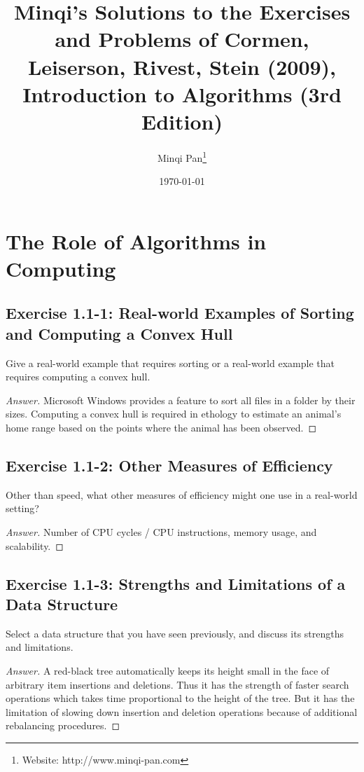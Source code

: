 \documentclass{amsbook}
\theoremstyle{definition}
\theoremstyle{remark}
\numberwithin{section}{chapter}
\numberwithin{equation}{chapter}
\begin{document}
\frontmatter
\title{Minqi's Solutions to the Exercises and Problems of Cormen, Leiserson, Rivest, Stein (2009), Introduction to Algorithms (3rd Edition)}

\author{Minqi Pan\footnote{Website: http://www.minqi-pan.com}}

\date{\today}

\maketitle

\setcounter{page}{4}

\tableofcontents

\listoffigures 

\mainmatter

\chapter{The Role of Algorithms in Computing}

\section{Exercise 1.1-1: Real-world Examples of Sorting and Computing a Convex Hull}
Give a real-world example that requires sorting or a real-world example that requires computing a convex hull.
\begin{proof}[Answer]
Microsoft Windows provides a feature to sort all files in a folder by their sizes. Computing a convex hull is required in ethology to estimate an animal's home range based on the points where the animal has been observed.
\end{proof}

\section{Exercise 1.1-2: Other Measures of Efficiency}
Other than speed, what other measures of efficiency might one use in a real-world setting?
\begin{proof}[Answer]
Number of CPU cycles / CPU instructions, memory usage, and scalability.
\end{proof}

\section{Exercise 1.1-3: Strengths and Limitations of a Data Structure}
Select a data structure that you have seen previously, and discuss its strengths and limitations.
\begin{proof}[Answer]
A red-black tree automatically keeps its height small in the face of arbitrary item insertions and deletions. Thus it has the strength of faster search operations which takes time proportional to the height of the tree. But it has the limitation of slowing down insertion and deletion operations because of additional rebalancing procedures. 
\end{proof}
\end{document}
